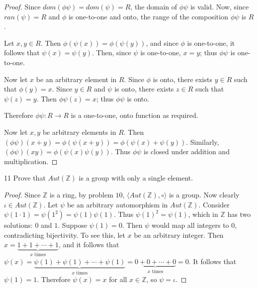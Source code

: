 \begin{proof}
    Since $dom(\phi \psi) = dom(\psi) = R$, the domain of $\phi \psi$ is valid.  
    Now, since $ran(\psi) = R$ and $\phi$ is one-to-one and onto, the range of the composition $\phi \psi$ is $R$.  

    Let $x, y \in R$.  
    Then $\phi(\psi(x)) = \phi(\psi(y))$, and since $\phi$ is one-to-one, it follows that $\psi(x) = \psi(y)$.  
    Then, since $\psi$ is one-to-one, $x = y$; thus $\phi \psi$ is one-to-one.  

    Now let $x$ be an arbitrary element in $R$.  
    Since $\phi$ is onto, there exists $y \in R$ such that $\phi(y) = x$.  
    Since $y \in R$ and $\psi$ is onto, there exists $z \in R$ such that $\psi(z) = y$.  
    Then $\phi \psi(z) = x$; thus $\phi \psi$ is onto.  

    Therefore $\phi \psi : R \longrightarrow R$ is a one-to-one, onto function as required.  

    Now let $x, y$ be arbitrary elements in $R$.  
    Then $(\phi \psi)(x + y) = \phi(\psi(x + y)) = \phi(\psi(x) + \psi(y))$.  
    Similarly, $(\phi \psi)(xy) = \phi(\psi(x)\psi(y))$.  
    Thus $\phi \psi$ is closed under addition and multiplication.
\end{proof}

\begin{problem}{11}
    Prove that $Aut(\mathbb{Z})$ is a group with only 
    a single element.
\end{problem}
\solved

\begin{proof}
    Since $\mathbb{Z}$ is a ring, by problem $10$, $\langle Aut(\mathbb{Z}), \circ \rangle$ is a group.
    Now clearly $\iota \in Aut(\mathbb{Z})$.
    Let $\psi$ be an arbitrary automorphism in $Aut(\mathbb{Z})$.
    Consider $\psi(1 \cdot 1) = \psi(1^2) = \psi(1)\psi(1)$.
    Thus $\psi(1)^2 = \psi(1)$, which in $\mathbb{Z}$ has two solutions: $0$ and $1$.
    Suppose $\psi(1) = 0$. 
    Then $\psi$ would map all integers to $0$, contradicting bijectivity.
    To see this, let $x$ be an arbitrary integer.
    Then $x = \underbrace{1 + 1 + \cdots + 1}_{x \text{ times}}$,
    and it follows that $
        \psi(x) = \underbrace{\psi(1) + \psi(1) + \cdots + \psi(1)}_{x \text{ times}} 
                  = \underbrace{0 + 0 + \cdots + 0}_{x \text{ times}} = 0$.
    It follows that $\psi(1) = 1$.
    Therefore $\psi(x) = x$ for all $x \in \mathbb{Z}$, so $\psi = \iota$.
\end{proof}

